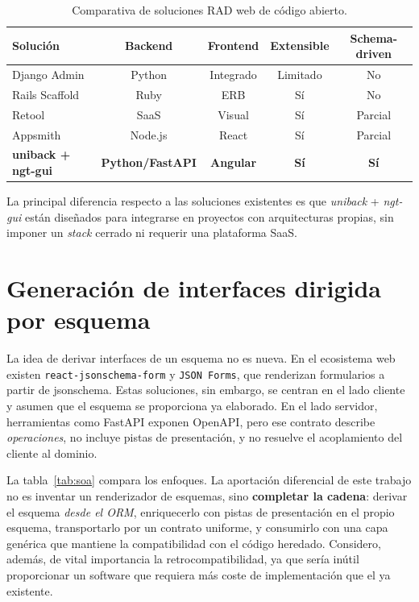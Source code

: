 \begin{table}[H]
  \centering
  \caption{Comparativa de soluciones RAD web de código abierto.}
  \label{tab:comparativa-rad}
  \begin{tabular}{lcccc}
    \toprule
    \textbf{Solución} & \textbf{Backend} & \textbf{Frontend} & \textbf{Extensible} &
    \textbf{Schema-driven} \\
    \midrule
    Django Admin & Python & Integrado & Limitado & No \\
    Rails Scaffold & Ruby & ERB & Sí & No \\
    Retool & SaaS & Visual & Sí & Parcial \\
    Appsmith & Node.js & React & Sí & Parcial \\
    \textbf{uniback + ngt-gui} & \textbf{Python/FastAPI} & \textbf{Angular} &
    \textbf{Sí} & \textbf{Sí} \\
    \bottomrule
  \end{tabular}
\end{table}

La principal diferencia respecto a las soluciones existentes es que \textit{uniback} +
\textit{ngt-gui} están diseñados para integrarse en proyectos con arquitecturas propias,
sin imponer un \emph{stack} cerrado ni requerir una plataforma SaaS.

\section{Generación de interfaces dirigida por esquema}
\label{sec:soa-interfaces}

La idea de derivar interfaces de un esquema no es nueva. En el ecosistema web
existen \texttt{react-jsonschema-form} y \texttt{JSON Forms}, que renderizan
formularios a partir de \gls{jsonschema}. Estas soluciones, sin embargo, se
centran en el lado cliente y asumen que el esquema se proporciona ya
elaborado. En el lado servidor, herramientas como FastAPI exponen OpenAPI,
pero ese contrato describe \emph{operaciones}, no incluye pistas de
presentación, y no resuelve el acoplamiento del cliente al dominio.

La tabla~\ref{tab:soa} compara los enfoques. La aportación diferencial de este
trabajo no es inventar un renderizador de esquemas, sino \textbf{completar la cadena}:
derivar el esquema \emph{desde el ORM}, enriquecerlo con
pistas de presentación en el propio esquema, transportarlo por un contrato
uniforme, y consumirlo con una capa genérica que mantiene la compatibilidad
con el código heredado. Considero, además, de vital importancia la retrocompatibilidad, ya que
sería inútil proporcionar un software que requiera más coste de implementación que el ya existente.

